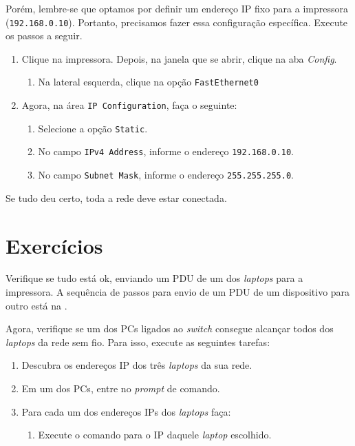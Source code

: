 Porém, lembre-se que optamos por definir um endereço IP fixo para a impressora (\texttt{192.168.0.10}). Portanto, precisamos fazer essa configuração específica. Execute os passos a seguir.

\begin{enumerate}[label*=\arabic*.]
  \item Clique na impressora. Depois, na janela que se abrir, clique na aba \textit{Config}.
  \begin{enumerate}[label*=\arabic*.]
    \item Na lateral esquerda, clique na opção \texttt{FastEthernet0}
  \end{enumerate}  
  \item Agora, na área \texttt{IP Configuration}, faça o seguinte:
  \begin{enumerate}[label*=\arabic*.]
     \item Selecione a opção \texttt{Static}.
     \item No campo \texttt{IPv4 Address}, informe o endereço \texttt{192.168.0.10}.
     \item No campo \texttt{Subnet Mask}, informe o endereço \texttt{255.255.255.0}.
  \end{enumerate}
\end{enumerate}

Se tudo deu certo, toda a rede deve estar conectada.

\section{Exercícios}\label{sec:ExercicioRedesComplexas}

Verifique se tudo está ok, enviando um PDU de um dos \textit{laptops} para a impressora. A sequência de passos para envio de um PDU de um dispositivo para outro está na .

Agora, verifique se um dos PCs ligados ao \textit{switch} consegue alcançar todos dos \textit{laptops} da rede sem fio. Para isso, execute as seguintes tarefas:

\begin{enumerate}[label*=\arabic*.]
\item Descubra os endereços IP dos três \textit{laptops} da sua rede.
\item Em um dos PCs, entre no \textit{prompt} de comando. 
\item Para cada um dos endereços IPs dos \textit{laptops} faça:
    \begin{enumerate}[label*=\arabic*.] 
       \item Execute o comando  para o IP daquele \textit{laptop} escolhido.
    \end{enumerate}
\end{enumerate}